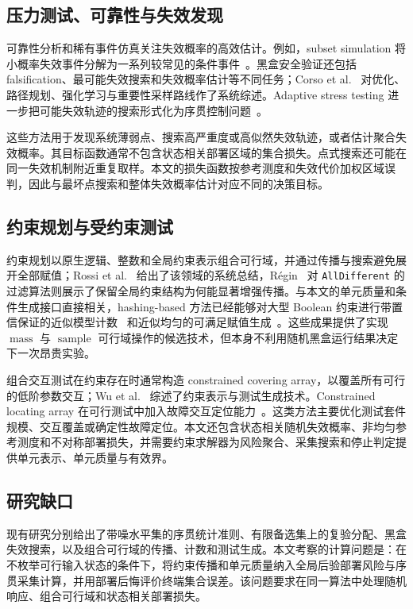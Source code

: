 \documentclass[UTF8,11pt,a4paper,fontset=none]{ctexart}
\newcommand{\1}{\mathbf 1}
\begin{document}
\subsection{压力测试、可靠性与失效发现}

可靠性分析和稀有事件仿真关注失效概率的高效估计。例如，subset simulation 将小概率失效事件分解为一系列较常见的条件事件~\cite{au2001}。黑盒安全验证还包括 falsification、最可能失效搜索和失效概率估计等不同任务；Corso et al.~\cite{corso2021} 对优化、路径规划、强化学习与重要性采样路线作了系统综述。Adaptive stress testing 进一步把可能失效轨迹的搜索形式化为序贯控制问题~\cite{lee2020}。

这些方法用于发现系统薄弱点、搜索高严重度或高似然失效轨迹，或者估计聚合失效概率。其目标函数通常不包含状态相关部署区域的集合损失。点式搜索还可能在同一失效机制附近重复取样。本文的损失函数按参考测度和失效代价加权区域误判，因此与最坏点搜索和整体失效概率估计对应不同的决策目标。

\subsection{约束规划与受约束测试}

约束规划以原生逻辑、整数和全局约束表示组合可行域，并通过传播与搜索避免展开全部赋值；Rossi et al.~\cite{rossi2006} 给出了该领域的系统总结，R\'{e}gin~\cite{regin1994} 对 \texttt{AllDifferent} 的过滤算法则展示了保留全局约束结构为何能显著增强传播。与本文的单元质量和条件生成接口直接相关，hashing-based 方法已经能够对大型 Boolean 约束进行带置信保证的近似模型计数~\cite{chakraborty2013count} 和近似均匀的可满足赋值生成~\cite{chakraborty2013sample}。这些成果提供了实现 $\operatorname{mass}$ 与 $\operatorname{sample}$ 可行域操作的候选技术，但本身不利用随机黑盒运行结果决定下一次昂贵实验。

组合交互测试在约束存在时通常构造 constrained covering array，以覆盖所有可行的低阶参数交互；Wu et al.~\cite{wu2019} 综述了约束表示与测试生成技术。Constrained locating array 在可行测试中加入故障交互定位能力~\cite{jin2020}。这类方法主要优化测试套件规模、交互覆盖或确定性故障定位。本文还包含状态相关随机失效概率、非均匀参考测度和不对称部署损失，并需要约束求解器为风险聚合、采集搜索和停止判定提供单元表示、单元质量与有效界。

\subsection{研究缺口}

现有研究分别给出了带噪水平集的序贯统计准则、有限备选集上的复验分配、黑盒失效搜索，以及组合可行域的传播、计数和测试生成。本文考察的计算问题是：在不枚举可行输入状态的条件下，将约束传播和单元质量纳入全局后验部署风险与序贯采集计算，并用部署后悔评价终端集合误差。该问题要求在同一算法中处理随机响应、组合可行域和状态相关部署损失。
\end{document}

